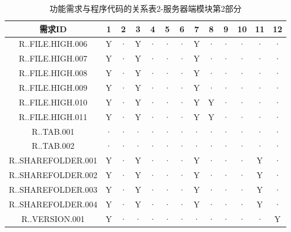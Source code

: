 \begin{table}[!ht]
\centering
\caption{功能需求与程序代码的关系表2-服务器端模块第2部分} \label{tab:requirement-module}
\begin{tabular}{|c|c|c|c|c|c|c|c|c|c|c|c|c|}
    \hline 
    需求ID & 1 & 2 & 3 & 4 & 5 & 6 & 7 & 8 & 9 & 10 & 11 & 12 \\    
    \hline 
    R..FILE.HIGH.006 &Y&· &Y&· &· &· &Y&· &· &· &· &  ·\\
    \hline
    R..FILE.HIGH.007 &Y&· &Y&· &· &· &Y&· &· &· &· &  ·\\
    \hline 
    R..FILE.HIGH.008 &Y&· &Y&· &· &· &Y&· &· &· &· &  ·\\
    \hline
    R..FILE.HIGH.009 &Y&· &Y&· &· &· &Y&· &· &· &· &  ·\\
    \hline
    R..FILE.HIGH.010 &Y&· &Y&· &· &· &Y&Y&· &· &· &  ·\\
    \hline
    R..FILE.HIGH.011 &Y&· &Y&· &· &· &Y&Y&· &· &· &  ·\\
    \hline
    R..TAB.001 &· &· &· &· &· &· &· &· &· &· &· &  ·\\
    \hline 
    R..TAB.002 &· &· &· &· &· &· &· &· &· &· &· &  ·\\
    \hline
    R..SHAREFOLDER.001 &Y&· &Y&· &· &· &Y&· &· &· &Y&  ·\\
    \hline
    R..SHAREFOLDER.002 &Y&· &Y&· &· &· &Y&· &· &· &Y&  ·\\
    \hline
    R..SHAREFOLDER.003 &Y&· &Y&· &· &· &Y&· &· &· &Y&  ·\\ 
    \hline
    R..SHAREFOLDER.004 &Y&· &Y&· &· &· &Y&· &· &· &Y&  ·\\ 
    \hline
    R..VERSION.001 &Y&· &· &· &· &· &· &· &· &· &· &Y \\
    \hline
\end{tabular}
\end{table}
